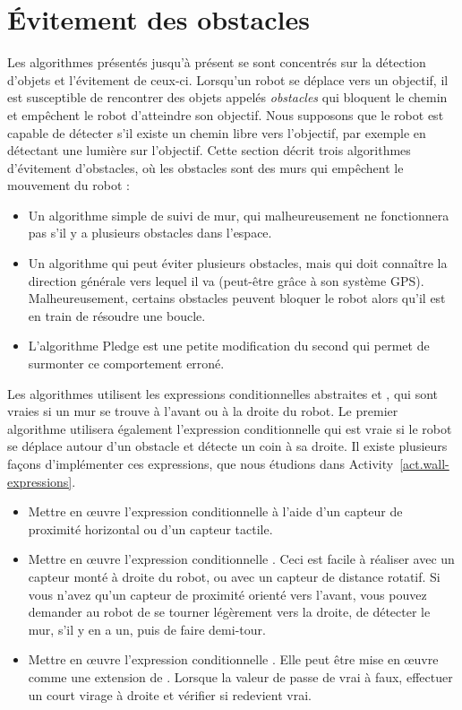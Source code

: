 \section{Évitement des obstacles}\label{s.obstacle-avoidance}

Les algorithmes présentés jusqu'à présent se sont concentrés sur la détection d'objets et l’évitement de ceux-ci. Lorsqu'un robot se déplace vers un objectif, il est susceptible de rencontrer des objets appelés \emph{obstacles} qui bloquent le chemin et empêchent le robot d'atteindre son objectif. Nous supposons que le robot est capable de détecter s'il existe un chemin libre vers l'objectif, par exemple en détectant une lumière sur l'objectif. Cette section décrit trois algorithmes d'évitement d'obstacles, où les obstacles sont des murs qui empêchent le mouvement du robot :
\begin{itemize}
\item Un algorithme simple de suivi de mur, qui malheureusement ne fonctionnera pas s'il y a plusieurs obstacles dans l'espace.
\item Un algorithme qui peut éviter plusieurs obstacles, mais qui doit connaître la direction générale vers lequel il va (peut-être grâce à son système GPS). Malheureusement, certains obstacles peuvent bloquer le robot alors qu’il est en train de résoudre une boucle.
\item L'algorithme Pledge est une petite modification du second qui permet de surmonter ce comportement erroné.
\end{itemize}
Les algorithmes utilisent les expressions conditionnelles abstraites  et , qui sont vraies si un mur se trouve à l'avant ou à la droite du robot. Le premier algorithme utilisera également l'expression conditionnelle  qui est vraie si le robot se déplace autour d'un obstacle et détecte un coin à sa droite. Il existe plusieurs façons d'implémenter ces expressions, que nous étudions dans Activity~\ref{act.wall-expressions}.

\begin{framed}
\begin{itemize}
\item Mettre en œuvre l'expression conditionnelle  à l'aide d'un capteur de proximité horizontal ou d'un capteur tactile.
\item Mettre en œuvre l'expression conditionnelle . Ceci est facile à réaliser avec un capteur monté à droite du robot, ou avec un capteur de distance rotatif. Si vous n'avez qu'un capteur de proximité orienté vers l'avant, vous pouvez demander au robot de se tourner légèrement vers la droite, de détecter le mur, s'il y en a un, puis de faire demi-tour.
\item Mettre en œuvre l'expression conditionnelle . Elle peut être mise en œuvre comme une extension de . Lorsque la valeur de  passe de vrai à faux, effectuer un court virage à droite et vérifier si  redevient vrai.
\end{itemize}
\end{framed}

